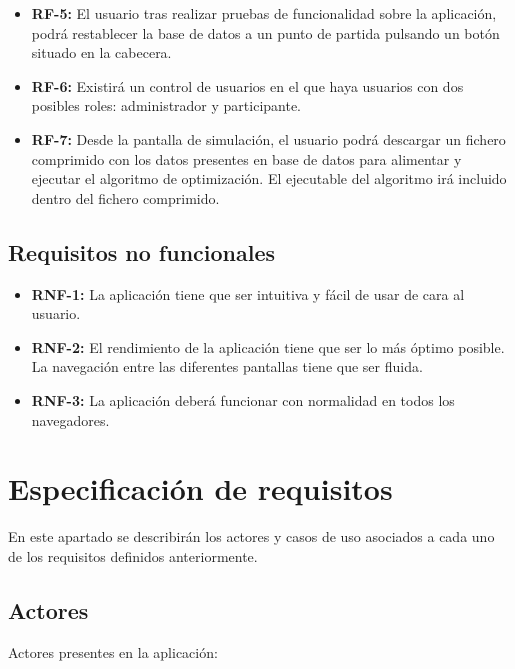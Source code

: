 \begin{itemize}
	\item \textbf{RF-5:} El usuario tras realizar pruebas de funcionalidad sobre la aplicación, podrá restablecer la base de datos a un punto de partida pulsando un botón situado en la cabecera.
	
	\item \textbf{RF-6:} Existirá un control de usuarios en el que haya usuarios con dos posibles roles: administrador y participante.
	
	\item \textbf{RF-7:} Desde la pantalla de simulación, el usuario podrá descargar un fichero comprimido con los datos presentes en base de datos para alimentar y ejecutar el algoritmo de optimización. El ejecutable del algoritmo irá incluido dentro del fichero comprimido.
\end{itemize}

\subsection{Requisitos no funcionales}

	\begin{itemize}
	
		\item \textbf{RNF-1:} La aplicación tiene que ser intuitiva y fácil de usar de cara al usuario.
		\item \textbf{RNF-2:} El rendimiento de la aplicación tiene que ser lo más óptimo posible. La navegación entre las diferentes pantallas tiene que ser fluida. 
		\item \textbf{RNF-3:} La aplicación deberá funcionar con normalidad en todos los navegadores.
		
	\end{itemize}
	
\newpage

\section{Especificación de requisitos}

En este apartado se describirán los actores y casos de uso asociados a cada uno de los requisitos definidos anteriormente. 

\subsection{Actores}

Actores presentes en la aplicación:

